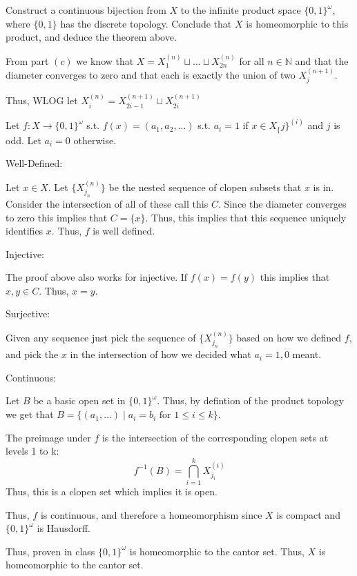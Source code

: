 \documentclass[12pt, letterpaper]{article}
\newcommand{\N}{\mathbb{N}}
\renewcommand{\t}[1]{\text{#1}}
\begin{document}
\begin{subproblem}{}
    Construct a continuous bijection from $X$ to the infinite
    product space $\{0,1\}^\omega$, where $\{0,1\}$ has the discrete
    topology. Conclude that $X$ is homeomorphic to this product, and
    deduce the theorem above.
\end{subproblem}
\begin{problemproof}
    From part $(c)$ we know that $X=X_1^{(n)} \sqcup \dots \sqcup X_{2n}^{(n)}$ for all $n \in \N$ and that the diameter converges to zero and that each is exactly the union of two $X_j^{(n+1)}$.

    Thus, WLOG let $X_i^{(n)}=X_{2i-1}^{(n+1)} \sqcup X_{2i}^{(n+1)}$

    Let $f: X \to \{0,1\}^\omega$ s.t. $f(x)=(a_1,a_2,\dots)$ s.t.
    $a_i = 1$ if $x \in X_\{j\}^{(i)}$ and $j$ is odd. Let $a_i=0$ otherwise.

    Well-Defined:

    Let $x \in X$. Let $\{X_{j_n}^{(n)}\}$ be the nested sequence of clopen subsets that $x$ is in. Consider the intersection of all of these call this $C$. Since the diameter converges to zero this implies that $C =\{x\}$. Thus, this implies that this sequence uniquely identifies $x$. Thus, $f$ is well defined.

    Injective:

    The proof above also works for injective. If $f(x)=f(y)$ this implies that $x,y \in C$. Thus, $x=y$.

    Surjective:

    Given any sequence just pick the sequence of $\{X_{j_n}^{(n)}\}$ based on how we defined $f$, and pick the $x$ in the intersection of how we decided what $a_i=1,0$ meant.

    Continuous:

    Let $B$ be a basic open set in $\{0,1\}^\omega$. Thus, by defintion of the product topology we get that $B=\{(a_1,\dots) \mid a_i =b_i \t{ for } 1 \leq i \leq k\}$.

    The preimage under $f$ is the intersection of the corresponding clopen sets at levels 1 to k:
    \[f^{-1}(B)=\bigcap_{i=1}^k X_{j_i}^{(i)}\]
    Thus, this is a clopen set which implies it is open.

    Thus, $f$ is continuous, and therefore a homeomorphism since $X$ is compact and $\{0,1\}^\omega$ is Hausdorff.

    Thus, proven in class $\{0,1\}^\omega$ is homeomorphic to the cantor set. Thus, $X$ is homeomorphic to the cantor set.
\end{problemproof}
\end{document}
